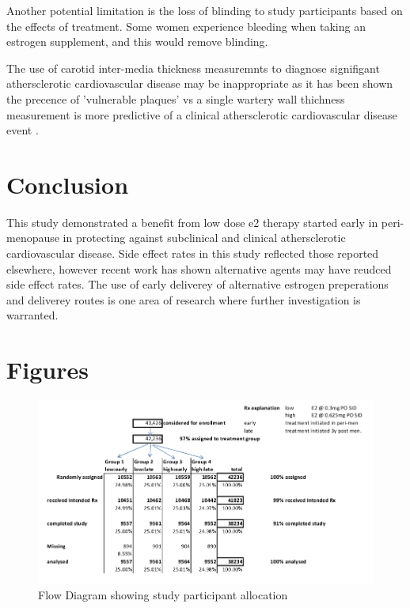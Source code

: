 \documentclass[11pt]{article}
\begin{document}
		Another potential limitation is the loss of blinding to study participants based on the effects of treatment. Some women experience bleeding when taking an estrogen supplement, and this would remove blinding.


		The use of carotid inter-media thickness measuremnts to diagnose signifigant athersclerotic cardiovascular disease may be inappropriate as it has been shown the precence of 'vulnerable plaques' vs a single wartery wall thichness measurement is more predictive of a clinical athersclerotic cardiovascular disease event \cite{Maseri2003}.
		

	\section{Conclusion}
		This study demonstrated a benefit from low dose e2 therapy started early in peri-menopause in protecting against subclinical and clinical athersclerotic cardiovascular disease.
		Side effect rates in this study reflected those reported elsewhere, however recent work has shown alternative agents may have reudced side effect rates.
		The use of early deliverey of alternative estrogen preperations and deliverey routes is one area of research where further investigation is warranted.


	\section{Figures}

\begin{figure}[h!]
	\centering
	\includegraphics[scale=0.5]{figure1.jpg}
	\caption{Flow Diagram showing study participant allocation}
	\label{flow}
\end{figure}
\end{document}
